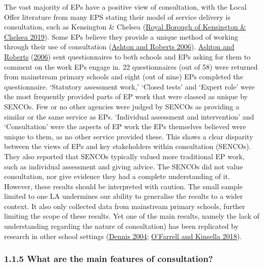 \documentclass[
]{article}
\begin{document}
The vast majority of EPs have a positive view of consultation, with the
Local Offer literature from many EPS stating their model of service
delivery is consultation, such as Kensington \& Chelsea
(\protect\hyperlink{ref-royalboroughofkensingtonchelseaEducationalPsychologyService2019}{Royal
Borough of Kensington \& Chelsea 2019}). Some EPs believe they provide a
unique method of working through their use of consultation
(\protect\hyperlink{ref-ashtonWhatValuableUnique2006}{Ashton and Roberts
2006}). \protect\hyperlink{ref-ashtonWhatValuableUnique2006}{Ashton and
Roberts} (\protect\hyperlink{ref-ashtonWhatValuableUnique2006}{2006})
sent questionnaires to both schools and EPs asking for them to comment
on the work EPs engage in. 22 questionnaires (out of 58) were returned
from mainstream primary schools and eight (out of nine) EPs completed
the questionnaire. `Statutory assessment work,' `Closed tests' and
`Expert role' were the most frequently provided parts of EP work that
were classed as unique by SENCOs. Few or no other agencies were judged
by SENCOs as providing a similar or the same service as EPs. `Individual
assessment and intervention' and `Consultation' were the aspects of EP
work the EPs themselves believed were unique to them, as no other
service provided these. This shows a clear disparity between the views
of EPs and key stakeholders within consultation (SENCOs). They also
reported that SENCOs typically valued more traditional EP work, such as
individual assessment and giving advice. The SENCOs did not value
consultation, nor give evidence they had a complete understanding of it.
However, these results should be interpreted with caution. The small
sample limited to one LA undermines our ability to generalise the
results to a wider context. It also only collected data from mainstream
primary schools, further limiting the scope of these results. Yet one of
the main results, namely the lack of understanding regarding the nature
of consultation) has been replicated by research in other school
settings (\protect\hyperlink{ref-dennisFarGoodQualitative2004}{Dennis
2004};
\protect\hyperlink{ref-ofarrellResearchExploringParents2018}{O'Farrell
and Kinsella 2018}).

\hypertarget{what-are-the-main-features-of-consultation}{%
\subsubsection{1.1.5 What are the main features of
consultation?}\label{what-are-the-main-features-of-consultation}}
\end{document}
